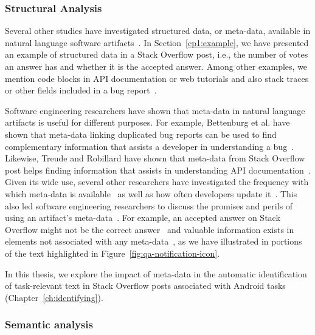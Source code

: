 \subsubsection{Structural Analysis}

Several other studies have 
investigated structured data, or meta-data, available in
natural language software artifacts~\cite{Ponzanelli2015}. In Section~\ref{cp1:example},
we have presented an example of structured data in a Stack Overflow post, 
i.e., the number of votes an answer has and whether it is the accepted answer.
Among other examples, we mention 
code blocks in API documentation or web tutorials 
and also stack traces or other fields included in a bug report~\cite{Davies2014, Breu2010}. 


Software engineering researchers have shown that meta-data in natural language artifacts 
is useful for different purposes. For example, 
Bettenburg et al. have shown that meta-data linking duplicated bug reports 
can be used to find complementary 
information that assists a developer in understanding a bug~\cite{bettenburg2008}.
Likewise,  Treude and Robillard have shown that meta-data from Stack Overflow post 
helps finding information that assists in understanding API documentation~\cite{Treude2016}.
Given its wide use, several other researchers have 
investigated the frequency with which
meta-data is available~\cite{Davies2014, bettenburg2008makes, uddin2015} 
as well as how often developers update it~\cite{ahmad2018, dig2006, shi2011}.
This also led 
software engineering researchers to discuss the promises and perils of 
using an artifact's meta-data~\cite{kalliamvakou2014, ahmad2018}.
For example, an accepted answer on Stack Overflow 
might not be the correct answer~\cite{wang2018}
and 
valuable information exists in elements not
associated with any meta-data~\cite{zhang2019so},
as we have illustrated in 
portions of the text highlighted in Figure~\ref{fig:qa-notification-icon}.


In this thesis, we explore the impact of meta-data in the automatic identification 
of task-relevant text in Stack Overflow posts 
associated with Android tasks (Chapter~\ref{ch:identifying}).





\subsubsection{Semantic analysis} 

